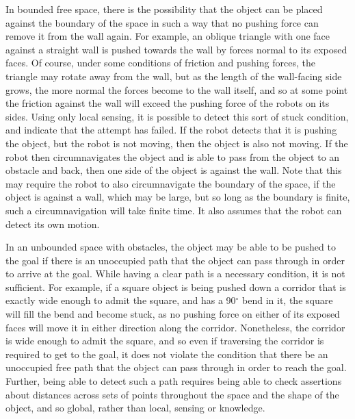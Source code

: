 In bounded free space, there is the possibility that the object can be placed against the boundary of the space in such a way that no pushing force can remove it from the wall again. 
For example, an oblique triangle with one face against a straight wall is pushed towards the wall by forces normal to its exposed faces. 
Of course, under some conditions of friction and pushing forces, the triangle may rotate away from the wall, but as the length of the wall-facing side grows, the more normal the forces become to the wall itself, and so at some point the friction against the wall will exceed the pushing force of the robots on its sides. 
Using only local sensing, it is possible to detect this sort of stuck condition, and indicate that the attempt has failed. 
If the robot detects that it is pushing the object, but the robot is not moving, then the object is also not moving. 
If the robot then circumnavigates the object and is able to pass from the object to an obstacle and back, then one side of the object is against the wall. 
Note that this may require the robot to also circumnavigate the boundary of the space, if the object is against a wall, which may be large, but so long as the boundary is finite, such a circumnavigation will take finite time. 
It also assumes that the robot can detect its own motion. 

In an unbounded space with obstacles, the object may be able to be pushed to the goal if there is an unoccupied path that the object can pass through in order to arrive at the goal. 
While having a clear path is a necessary condition, it is not sufficient. 
For example, if a square object is being pushed down a corridor that is exactly wide enough to admit the square, and has a 90$^{\circ}$ bend in it, the square will fill the bend and become stuck, as no pushing force on either of its exposed faces will move it in either direction along the corridor. 
Nonetheless, the corridor is wide enough to admit the square, and so even if traversing the corridor is required to get to the goal, it does not violate the condition that there be an unoccupied free path that the object can pass through in order to reach the goal. 
Further, being able to detect such a path requires being able to check assertions about distances across sets of points throughout the space and the shape of the object, and so global, rather than local, sensing or knowledge. 

